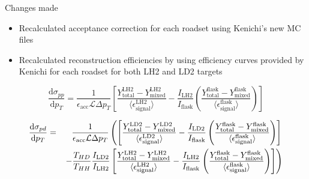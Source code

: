\documentclass[aspectratio=169, 10pt]{beamer}
\providecommand{\diffd}{\mathrm{d}}
\begin{document}
\begin{frame}{Changes made}
    \begin{itemize}
        \item Recalculated acceptance correction for each roadset using Kenichi's new MC files
        \vspace{0.2cm}
        \item Recalculated reconstruction efficiencies by using efficiency curves provided by Kenichi for each roadset for both LH2 and LD2 targets
    \end{itemize}
    \vspace{0.3cm}
    \begin{equation}
        \frac{\diffd\sigma_{pp}}{\diffd p_{T}} = \frac{1}{\epsilon_{\text{acc}} \mathcal{L} \Delta p_{T}} 
        \left[ 
            \frac{Y^{\text{LH2}}_{\text{total}} - Y^{\text{LH2}}_{\text{mixed}}}{\langle\epsilon^{\text{LH2}}_{\text{signal}}\rangle} 
            - \frac{I_{\text{LH2}}}{I_{\text{flask}}} 
            \left( \frac{Y^{\text{flask}}_{\text{total}} - Y^{\text{flask}}_{\text{mixed}}}{\langle\epsilon^{\text{flask}}_{\text{signal}}\rangle} \right)
        \right]
        \label{eq:modified_cross_section_pt}
    \end{equation}

    \vspace{0.3em}
    \begin{eqnarray}
        \frac{\diffd\sigma_{pd}}{\diffd p_{T}} &=& \frac{1}{\epsilon_{\text{acc}} \mathcal{L} \Delta p_{T}} 
        \left(
        \left[ 
            \frac{Y^{\text{LD2}}_{\text{total}} - Y^{\text{LD2}}_{\text{mixed}}}{\langle\epsilon^{\text{LD2}}_{\text{signal}}\rangle} 
- \frac{I_{\text{LD2}}}{I_{\text{flask}}} 
            \left( \frac{Y^{\text{flask}}_{\text{total}} - Y^{\text{flask}}_{\text{mixed}}}{\langle\epsilon^{\text{flask}}_{\text{signal}}\rangle} \right)
        \right] \right. \nonumber \\
        & & \left. - \frac{T_{HD}}{T_{HH}} \frac{I_{\rm LD2}}{I_{\rm LH2}}\left[ 
            \frac{Y^{\text{LH2}}_{\text{total}} - Y^{\text{LH2}}_{\text{mixed}}}{\langle\epsilon^{\text{LH2}}_{\text{signal}}\rangle} 
- \frac{I_{\text{LH2}}}{I_{\text{flask}}} 
            \left( \frac{Y^{\text{flask}}_{\text{total}} - Y^{\text{flask}}_{\text{mixed}}}{\langle\epsilon^{\text{flask}}_{\text{signal}}\rangle} \right)
        \right]
        \right)
        \label{eq:modified_cross_section_pd_pt}
    \end{eqnarray}

    


\end{frame}
\end{document}
